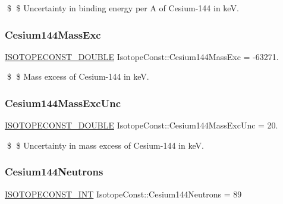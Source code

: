 \$ \$ Uncertainty in binding energy per A of Cesium-\/144 in keV. \mbox{\label{group___isotope_const-_cesium-_cs144_ga4aca6578a5ff2fbad78aa00d9905f16e}} 
\subsubsection{\texorpdfstring{Cesium144\+Mass\+Exc}{Cesium144MassExc}}
{\footnotesize\ttfamily \mbox{\hyperlink{group___isotope_const-_macros_ga8f45a7272ce02c0b4c65c44636ed719a}{I\+S\+O\+T\+O\+P\+E\+C\+O\+N\+S\+T\+\_\+\+D\+O\+U\+B\+LE}} Isotope\+Const\+::\+Cesium144\+Mass\+Exc = -\/63271.}

\$ \$ Mass excess of Cesium-\/144 in keV. \mbox{\label{group___isotope_const-_cesium-_cs144_gaacbcdc5a76ebca29e77b242f4b3e444f}} 
\subsubsection{\texorpdfstring{Cesium144\+Mass\+Exc\+Unc}{Cesium144MassExcUnc}}
{\footnotesize\ttfamily \mbox{\hyperlink{group___isotope_const-_macros_ga8f45a7272ce02c0b4c65c44636ed719a}{I\+S\+O\+T\+O\+P\+E\+C\+O\+N\+S\+T\+\_\+\+D\+O\+U\+B\+LE}} Isotope\+Const\+::\+Cesium144\+Mass\+Exc\+Unc = 20.}

\$ \$ Uncertainty in mass excess of Cesium-\/144 in keV. \mbox{\label{group___isotope_const-_cesium-_cs144_ga0a42b82a62a7160cf5a3705dc9243891}} 
\subsubsection{\texorpdfstring{Cesium144\+Neutrons}{Cesium144Neutrons}}
{\footnotesize\ttfamily \mbox{\hyperlink{group___isotope_const-_macros_ga5f18360b3e99483a35c32d789e62621c}{I\+S\+O\+T\+O\+P\+E\+C\+O\+N\+S\+T\+\_\+\+I\+NT}} Isotope\+Const\+::\+Cesium144\+Neutrons = 89}

